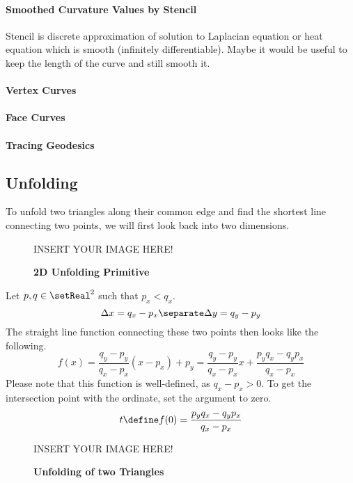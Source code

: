 \documentclass{stdlocal}
\begin{document}
  \paragraph{Smoothed Curvature Values by Stencil}
    Stencil is discrete approximation of solution to Laplacian equation or heat equation which is smooth (infinitely differentiable).
    Maybe it would be useful to keep the length of the curve and still smooth it.
  \paragraph{Vertex Curves}
  \paragraph{Face Curves}
  \paragraph{Tracing Geodesics}

\subsection{Unfolding} %
\label{sub:unfolding}
To unfold two triangles along their common edge and find the shortest line connecting two points, we will first look back into two dimensions.

\begin{figure}[h]
  \begin{center}
    \large
    INSERT YOUR IMAGE HERE!
  \end{center}
  \caption[2D Unfolding Primitive]{%
    \textbf{2D Unfolding Primitive}
  }
\end{figure}

Let $p,q\in\setReal^2$ such that $p_x < q_x$.
\[
  \Delta x = q_x - p_x
  \separate
  \Delta y = q_y - p_y
\]
The straight line function connecting these two points then looks like the following.
\[
  f(x) = \frac{q_y - p_y}{q_x - p_x}(x - p_x) + p_y = \frac{q_y - p_y}{q_x - p_x}x + \frac{p_yq_x - q_yp_x}{q_x - p_x}
\]
Please note that this function is well-defined, as $q_x - p_x > 0$.
To get the intersection point with the ordinate, set the argument to zero.
\[
  t\define f(0) = \frac{p_yq_x - q_yp_x}{q_x - p_x}
\]
\begin{figure}[h]
  \begin{center}
    \large
    INSERT YOUR IMAGE HERE!
  \end{center}
  \caption[Unfolding of two Triangles]{%
    \textbf{Unfolding of two Triangles}
  }
\end{figure}
\end{document}
